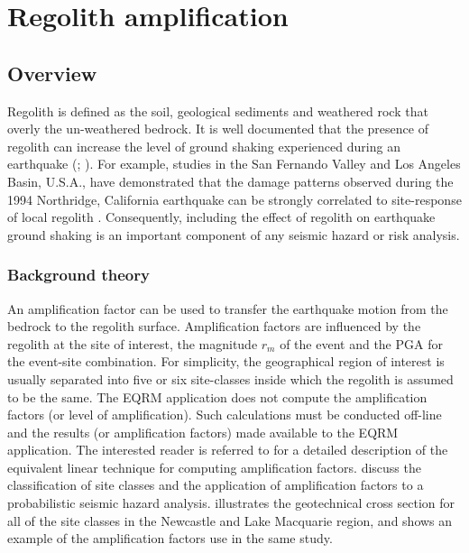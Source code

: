 \chapter{Regolith amplification}
\label{ch:reg}


\section{Overview}

Regolith is defined as the soil, geological sediments and
weathered rock that overly the un-weathered bedrock. It is well
documented that the presence of regolith can increase the level of
ground shaking experienced during an earthquake
(\citealt{dr_Borcherdt76a}; \citealt{dr_Murphy71a}).  For example,
studies in the San Fernando Valley and Los Angeles Basin, U.S.A.,
have demonstrated that the damage patterns observed during the
1994 Northridge, California earthquake can be strongly correlated
to site-response of local regolith \citep{dr_Meremonte96a}.
Consequently, including the effect of regolith on earthquake
ground shaking is an important component of any seismic hazard or
risk analysis.

\subsection{Background theory}

An amplification factor can be used to transfer the earthquake
motion from the bedrock to the regolith surface. Amplification
factors are influenced by the regolith at the site of interest,
the magnitude $r_m$ of the event and the PGA for the event-site
combination. For simplicity, the geographical region of interest
is usually separated into five or six site-classes inside which
the regolith is assumed to be the same. The EQRM application does
not compute the amplification factors (or level of amplification).
Such calculations must be conducted off-line and the results (or
amplification factors) made available to the EQRM application. The
interested reader is referred to \citet{dr_Robinson06a} for a
detailed description of the equivalent linear technique for
computing amplification factors. \citet{dr_Dhu02b} discuss the
classification of site classes and the application of
amplification factors to a probabilistic seismic hazard analysis.
 illustrates the
geotechnical cross section for all of the site classes in the
Newcastle and Lake Macquarie region, and
 shows an example of the
amplification factors use in the same study.


